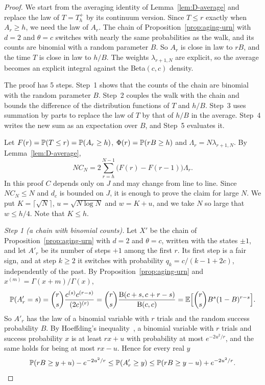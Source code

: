 \begin{proof}
We start from the averaging identity of Lemma~\ref{lem:D-average} and replace
the law of $T=T^+_h$ by its continuum version. Since $T\le r$ exactly when
$A_r\ge h$, we need the law of $A_r$. The chain of
Proposition~\ref{prop:aging-urn} with $d=2$ and $\theta=c$ switches with
nearly the same probabilities as the walk, and its counts are binomial with a
random parameter $B$. So $A_r$ is close in law to $rB$, and the time $T$ is
close in law to $h/B$. The weights $\lambda_{r+1,N}$ are explicit, so the
average becomes an explicit integral against the Beta$(c,c)$ density.

The proof has 5 steps. Step~1 shows that the counts of the chain are
binomial with the random parameter $B$. Step~2 couples the walk with the chain
and bounds the difference of the distribution functions of $T$ and $h/B$. Step~3 uses
summation by parts to replace the law of $T$ by that of $h/B$ in the average.
Step~4 writes the new sum as an expectation over $B$, and Step~5 evaluates it.

Let $F(r)=\mathbb{P}(T\le r)=\mathbb{P}(A_r\ge h)$, $\Phi(r)=\mathbb{P}(rB\ge h)$ and
$\Lambda_r=N\lambda_{r+1,N}$. By Lemma~\ref{lem:D-average},
\[
NC_N=2\sum_{r=h}^{N-1}\bigl(F(r)-F(r-1)\bigr)\Lambda_r .
\]
In this proof $C$ depends only on $J$ and may change from line to line. Since
$NC_N\le N$ and $d_c$ is bounded on $J$, it is enough to prove the claim for
large $N$. We put $K=\lceil\sqrt N\rceil$, $u=\sqrt{N\log N}$ and $w=K+u$, and
we take $N$ so large that $w\le h/4$. Note that $K\le h$.

\emph{Step 1 (a chain with binomial counts).} Let $X'$ be the chain of
Proposition~\ref{prop:aging-urn} with $d=2$ and $\theta=c$, written with the
states $\pm1$, and let $A'_r$ be its number of steps $+1$ among the first $r$.
Its first step is a fair sign, and at step $k\ge2$ it switches with
probability $q_k=c/(k-1+2c)$, independently of the past. By
Proposition~\ref{prop:aging-urn} and $x^{(m)}=\Gamma(x+m)/\Gamma(x)$,
\[
\mathbb{P}(A'_r=s)=\binom rs\frac{c^{(s)}c^{(r-s)}}{(2c)^{(r)}}
=\binom rs\frac{\mathrm B(c+s,c+r-s)}{\mathrm B(c,c)}
=\mathbb{E}\Bigl[\binom rsB^s(1-B)^{r-s}\Bigr].
\]
So $A'_r$ has the law of a binomial variable with $r$ trials and the random
success probability $B$. By Hoeffding's inequality~\cite[Theorem~1]{hoeffding1963},
a binomial variable with $r$ trials and success probability $x$ is at least
$rx+u$ with probability at most $e^{-2u^2/r}$, and the same holds for being at
most $rx-u$. Hence for every real $y$
\[
\mathbb{P}(rB\ge y+u)-e^{-2u^2/r}\le\mathbb{P}(A'_r\ge y)\le\mathbb{P}(rB\ge y-u)+e^{-2u^2/r}.
\]


\end{proof}
